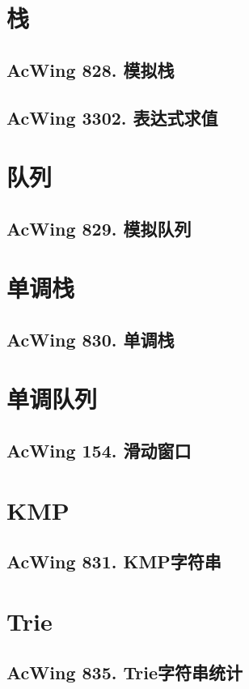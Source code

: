 \section{栈}
\subsection{AcWing 828. 模拟栈}
\subsection{AcWing 3302. 表达式求值}

\section{队列}
\subsection{AcWing 829. 模拟队列}

\section{单调栈}

\subsection{AcWing 830. 单调栈}

\section{单调队列}
\subsection{AcWing 154. 滑动窗口}

\section{KMP}
\subsection{AcWing 831. KMP字符串}

\section{Trie}
\subsection{AcWing 835. Trie字符串统计}
